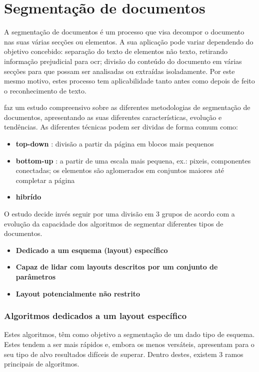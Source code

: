 \section{Segmentação de documentos}
\label{sec_segmentacao_docs}

A segmentação de documentos é um processo que visa decompor o documento nas suas várias secções ou elementos. A sua aplicação pode variar dependendo do objetivo concebido: separação do texto de elementos não texto, retirando informação prejudicial para \acrshort{ocr}; divisão do conteúdo do documento em várias secções para que possam ser analisadas ou extraídas isoladamente. Por este mesmo motivo, estes processo tem aplicabilidade tanto antes como depois de feito o reconhecimento de texto.

\cite{ESKENAZI20171} faz um estudo compreensivo sobre as diferentes metodologias de segmentação de documentos, apresentando as suas diferentes características, evolução e tendências. 
As diferentes técnicas podem ser dividas de forma comum como: 
\begin{itemize}
    \item \textbf{top-down} : divisão a partir da página em blocos mais pequenos
    \item \textbf{bottom-up} : a partir de uma escala mais pequena, ex.: pixeis, componentes conectadas; os elementos são aglomerados em conjuntos maiores até completar a página
    \item \textbf{hibrído}
\end{itemize}

O estudo decide invés seguir por uma divisão em 3 grupos de acordo com a evolução da capacidade dos algoritmos de segmentar diferentes tipos de documentos.
\begin{itemize}
    \item \textbf{Dedicado a um esquema (layout) específico}
    \item \textbf{Capaz de lidar com layouts descritos por um conjunto de parâmetros}
    \item \textbf{Layout potencialmente não restrito}
\end{itemize}

\subsubsection{Algoritmos dedicados a um layout específico}

Estes algoritmos, têm como objetivo a segmentação de um dado tipo de esquema. Estes tendem a ser mais rápidos e, embora os menos versáteis, apresentam para o seu tipo de alvo resultados difíceis de superar. Dentro destes, existem 3 ramos principais de algoritmos. 

